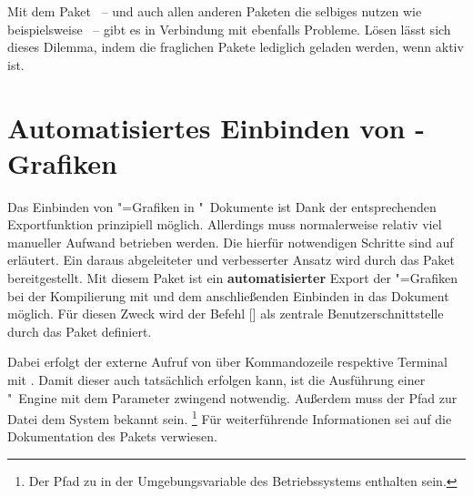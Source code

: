 %
Mit dem Paket ~-- und auch allen anderen Paketen die 
selbiges nutzen wie beispielsweise ~-- gibt es in Verbindung 
mit  ebenfalls Probleme. Lösen lässt sich dieses Dilemma, 
indem die fraglichen Pakete lediglich geladen werden, wenn  
aktiv ist.
%
\begin{quoting}[rightmargin=0pt]
\begin{Code}
\ifpdf
  \usepackage{tikz}%
\fi
\end{Code}
\end{quoting}



\section{%
  Automatisiertes Einbinden von 
  -Grafiken%
}
%
%
%
Das Einbinden von "=Grafiken in "~Dokumente
ist Dank der entsprechenden Exportfunktion prinzipiell möglich. Allerdings muss 
normalerweise relativ viel manueller Aufwand betrieben werden. Die hierfür 
notwendigen Schritte sind auf  erläutert. Ein daraus 
abgeleiteter und verbesserter Ansatz wird durch das Paket  
bereitgestellt. Mit diesem Paket ist ein \textbf{automatisierter} Export der 
"=Grafiken bei der Kompilierung mit  
und dem anschließenden Einbinden in das Dokument möglich. Für diesen Zweck wird 
der Befehl [] als 
zentrale Benutzerschnittstelle durch das Paket definiert.

Dabei erfolgt der externe Aufruf von  über Kommandozeile 
respektive Terminal mit . Damit dieser auch tatsächlich 
erfolgen kann, ist die Ausführung einer "~Engine mit dem
Parameter  zwingend notwendig. Außerdem muss der Pfad 
zur Datei  dem System bekannt sein.%
\footnote{%
  Der Pfad zu  in der Umgebungsvariable  des 
  Betriebssystems enthalten sein.%
}
Für weiterführende Informationen sei auf die Dokumentation des Pakets 
 verwiesen.



